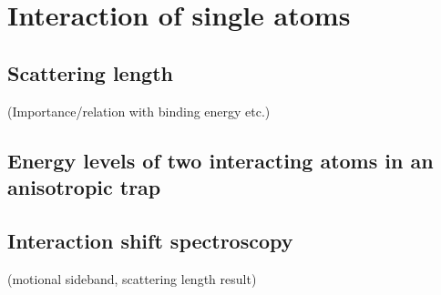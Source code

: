 
\chapter{Interaction of single atoms}

\section{Scattering length}
(Importance/relation with binding energy etc.)

\section{Energy levels of two interacting atoms in an anisotropic trap}

\section{Interaction shift spectroscopy}
(motional sideband, scattering length result)
